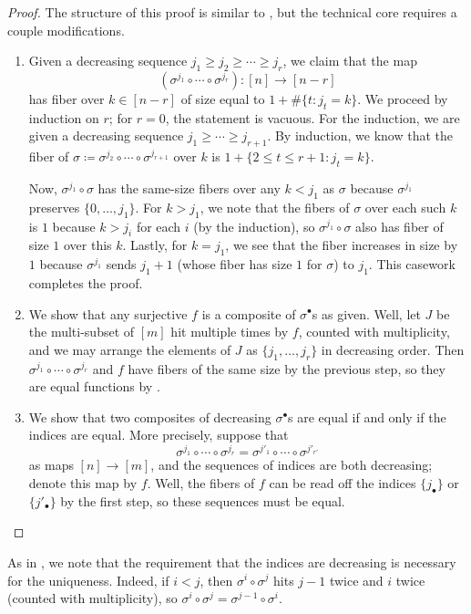 \documentclass[../notes.tex]{subfiles}
\begin{document}
\begin{proof}
	The structure of this proof is similar to , but the technical core requires a couple modifications.
	\begin{enumerate}
		\item Given a decreasing sequence $j_1\ge j_2\ge\cdots\ge j_r$, we claim that the map
		\[(\sigma^{j_1}\circ\cdots\circ\sigma^{j_r})\colon[n]\to[n-r]\]
		has fiber over $k\in[n-r]$ of size equal to $1+\#\{t:j_t=k\}$. We proceed by induction on $r$; for $r=0$, the statement is vacuous. For the induction, we are given a decreasing sequence $j_1\ge\cdots\ge j_{r+1}$. By induction, we know that the fiber of $\sigma\coloneqq\sigma^{j_2}\circ\cdots\circ\sigma^{j_{r+1}}$ over $k$ is $1+\{2\le t\le r+1:j_t=k\}$.
		
		Now, $\sigma^{j_1}\circ\sigma$ has the same-size fibers over any $k<j_1$ as $\sigma$ because $\sigma^{j_1}$ preserves $\{0,\ldots,j_1\}$. For $k>j_1$, we note that the fibers of $\sigma$ over each such $k$ is $1$ because $k>j_i$ for each $i$ (by the induction), so $\sigma^{j_1}\circ\sigma$ also has fiber of size $1$ over this $k$. Lastly, for $k=j_1$, we see that the fiber increases in size by $1$ because $\sigma^{j_1}$ sends $j_1+1$ (whose fiber has size $1$ for $\sigma$) to $j_1$. This casework completes the proof.

		\item We show that any surjective $f$ is a composite of $\sigma^\bullet$s as given. Well, let $J$ be the multi-subset of $[m]$ hit multiple times by $f$, counted with multiplicity, and we may arrange the elements of $J$ as $\{j_1,\ldots,j_r\}$ in decreasing order. Then $\sigma^{j_1}\circ\cdots\circ\sigma^{j_r}$ and $f$ have fibers of the same size by the previous step, so they are equal functions by .

		\item We show that two composites of decreasing $\sigma^\bullet$s are equal if and only if the indices are equal. More precisely, suppose that
		\[\sigma^{j_1}\circ\cdots\circ\sigma^{j_r}=\sigma^{j'_1}\circ\cdots\circ\sigma^{j'_{r'}}\]
		as maps $[n]\to[m]$, and the sequences of indices are both decreasing; denote this map by $f$. Well, the fibers of $f$ can be read off the indices $\{j_\bullet\}$ or $\{j'_\bullet\}$ by the first step, so these sequences must be equal.
		\qedhere
	\end{enumerate}
\end{proof}
\begin{remark} \label{rem:sigma-relation}
	As in , we note that the requirement that the indices are decreasing is necessary for the uniqueness. Indeed, if $i<j$, then $\sigma^i\circ\sigma^j$ hits $j-1$ twice and $i$ twice (counted with multiplicity), so $\sigma^i\circ\sigma^j=\sigma^{j-1}\circ\sigma^i$.
\end{remark}
\end{document}
